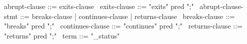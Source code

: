 \begin{syntax}
  abrupt-clause ::= exits-clause
  \
  exits-clause ::= "exits" pred ";"
  \
  abrupt-clause-stmt ::= breaks-clause | continues-clause | returns-clause
  \
  breaks-clause ::= "breaks" pred ";"
  \
  continues-clause ::= "continues" pred ";"
  \
  returns-clause ::= "returns" pred ";"
  \
  term  ::= "\exit_status"
\end{syntax}
